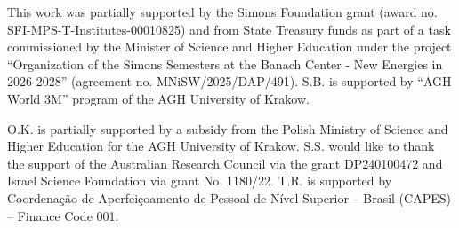 \documentclass[11pt,reqno]{amsart}
\theoremstyle{definition}
\theoremstyle{remark}
\theoremstyle{plain}
\numberwithin{equation}{section}
\begin{document}
This work was partially supported by the Simons Foundation grant (award no. SFI-MPS-T-Institutes-00010825) and from State Treasury funds as part of a task commissioned by the Minister of Science and Higher Education under the project “Organization of the Simons Semesters at the Banach Center - New Energies in 2026-2028” (agreement no. MNiSW/2025/DAP/491).
S.B. is supported by ``AGH World 3M'' program of the AGH University of Krakow. 

O.K. is partially supported by a subsidy from the Polish Ministry of Science and Higher Education for the AGH University of Krakow. 
S.S. would like to thank the support of the Australian Research Council via the grant DP240100472 and Israel Science Foundation via grant No. 1180/22. T.R. is supported by Coordenação de Aperfeiçoamento de Pessoal de Nível Superior – Brasil (CAPES) – Finance Code 001.



\end{document}

